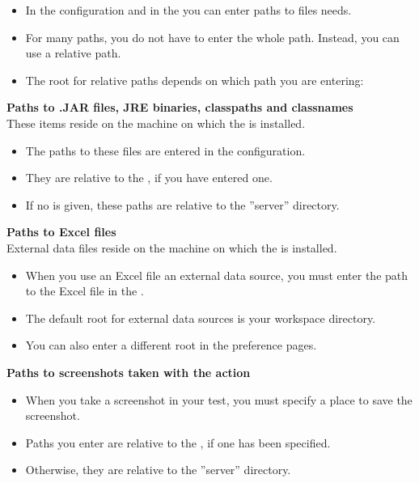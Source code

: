 \begin{itemize}
\item In the \gdaut{} configuration and in the \gdpropview{} you can enter paths to files \app{} needs. 
\item For many paths, you do not have to enter the whole path. Instead, you can use a relative path.
\item The root for relative paths depends on which path you are entering:
\end{itemize}

\textbf{Paths to .JAR files, JRE binaries, classpaths and classnames}\\
These items reside on the machine on which the \gdagent is installed. 
\begin{itemize}
\item The paths to these files are entered in the \gdaut{} configuration. 
\item They are relative to the \gdaut{} , if you have entered one. 
\item If no \gdaut{}  is given, these paths are relative to the ''server'' directory. 
\end{itemize}


\textbf{Paths to Excel files}\\
External data files reside on the machine on which the \ite{} is installed. 
\begin{itemize}
\item When you use an Excel file  an external data source, you  must enter the path to the Excel file in the \gdpropview{}.  
\item The default root for external data sources is your workspace directory.
\item You can also enter a different root in the preference pages. 
\end{itemize}

\textbf{Paths to screenshots taken with the  action}\\
\begin{itemize}
\item When you take a screenshot in your test, you must specify a place to save the screenshot. 
\item Paths you enter are relative to the \gdaut{} , if one has been specified. 
\item Otherwise, they are relative to the ''server'' directory. 
\end{itemize}

